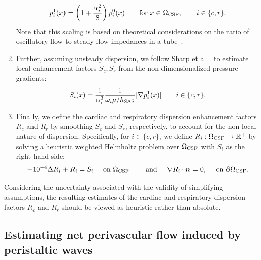 \documentclass[fleqn,10pt]{wlscirep}
\begin{document}
\begin{enumerate}[label=\roman*)]
\begin{equation}
    p^1_i(x) = \left ( 1 + \frac{\alpha_i^2}{8} \right ) p_i^0(x)
    \qquad \text{for } x \in \Omega_{\rm CSF}, \qquad i \in \{c, r\}.
  \end{equation}
  Note that this scaling is based on theoretical considerations on the
  ratio of oscillatory flow to steady flow impedances in a
  tube~\cite[Chap.~4.3.]{van1998cardiovascular}.
\item
  Further, assuming unsteady dispersion, we follow Sharp et
  al.~\cite{sharp2019dispersion} to estimate local enhancement factors
  $S_c, S_r$ from the non-dimensionalized pressure gradients:
  \begin{equation}
    S_i(x) = \frac{1}{\alpha_i^3} \frac{1}{\omega_i \mu/h_{\rm SAS}} | \nabla p_i^1(x) |
    \qquad i \in \{c, r\}.
  \end{equation}
\item
  Finally, we define the cardiac and respiratory dispersion
  enhancement factors $R_c$ and $R_r$ by smoothing $S_c$ and $S_r$,
  respectively, to account for the non-local nature of
  dispersion. Specifically, for $i \in \{c, r\}$, we define $R_i :
  \Omega_{\rm CSF} \rightarrow \mathbb{R}^{+}$ by solving a heuristic weighted
  Helmholtz problem over $\Omega_{\rm CSF}$ with $S_i$ as the
  right-hand side:
  \begin{equation}
    - 10^{-4} \Delta R_i + R_i
    = S_i \quad \text{ on } \Omega_{\rm CSF}
    \qquad \text{ and } \quad
    \nabla R_i \cdot \bm n = 0, \quad \text{ on } \partial \Omega_{\rm CSF} .
\end{equation}
\end{enumerate}
Considering the uncertainty associated with the validity of
simplifying assumptions, the resulting estimates of the cardiac and
respiratory dispersion factors $R_c$ and $R_r$ 
should be viewed as heuristic rather than absolute.

\subsection{Estimating net perivascular flow induced by peristaltic waves}
\label{sec:app:peristalsis}
\end{document}
